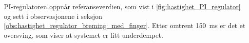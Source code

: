 PI-regulatoren oppnår referanseverdien, som vist i \autoref{fig:hastighet_PI_regulator} og sett i observasjonene i seksjon \ref{obs:hastighet_regulator_breming_med_finger}. Etter omtrent \SI{150}{\milli\second} er det et oversving, som viser at systemet er litt underdempet. 

